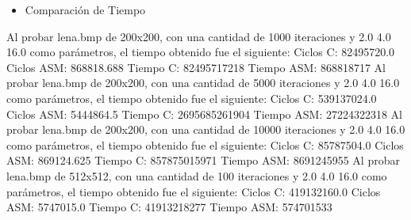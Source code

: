 \documentclass[10pt, a4paper]{article}
\begin{document}
\begin{itemize}
\begin{itemize}
\item{Comparación de Tiempo}
\end{itemize}
Al probar lena.bmp de 200x200, con una cantidad de 1000 iteraciones y 2.0 4.0 16.0 como parámetros, el tiempo obtenido fue el siguiente:\newline
Ciclos C:                 82495720.0\newline
Ciclos ASM:               868818.688\newline
\newline
Tiempo C:                 82495717218\newline
Tiempo ASM:               868818717\newline
\newline
Al probar lena.bmp de 200x200, con una cantidad de 5000 iteraciones y 2.0 4.0 16.0 como parámetros, el tiempo obtenido fue el siguiente:\newline
Ciclos C:                 539137024.0\newline
Ciclos ASM:               5444864.5\newline
\newline
Tiempo C:                 2695685261904\newline
Tiempo ASM:               27224322318\newline
\newline
Al probar lena.bmp de 200x200, con una cantidad de 10000 iteraciones y 2.0 4.0 16.0 como parámetros, el tiempo obtenido fue el siguiente:\newline
Ciclos C:                 85787504.0\newline
Ciclos ASM:               869124.625\newline
\newline
Tiempo C:                 857875015971\newline
Tiempo ASM:               8691245955\newline
\newline
Al probar lena.bmp de 512x512, con una cantidad de 100 iteraciones y 2.0 4.0 16.0 como parámetros, el tiempo obtenido fue el siguiente:\newline
Ciclos C:                 419132160.0\newline
Ciclos ASM:               5747015.0\newline
\newline
Tiempo C:                 41913218277\newline
Tiempo ASM:               574701533\newline

\end{itemize}
\end{document}
